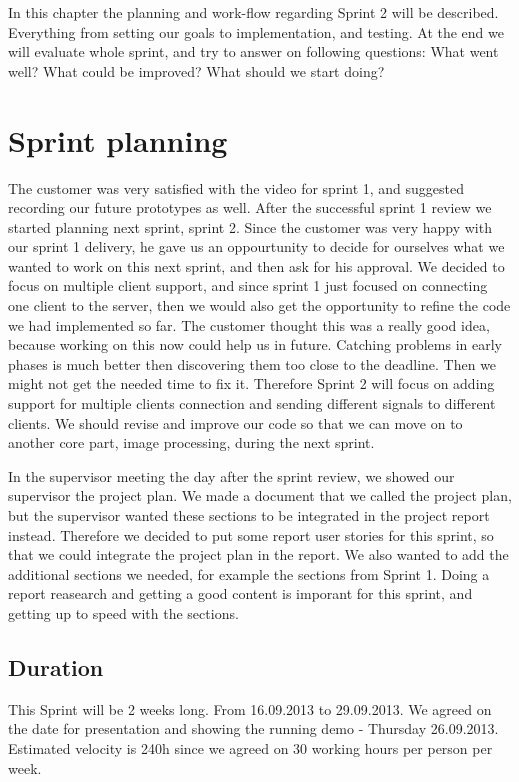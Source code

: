 In this chapter the planning and work-flow regarding Sprint 2 will be described. 
Everything from setting our goals to implementation, and testing. At the end we will evaluate whole sprint, and try to answer on following questions: What went well? What could be improved? What should we start doing? 

\section{Sprint planning}
The customer was very satisfied with the video for sprint 1, and suggested recording our future prototypes as well. 
After the successful sprint 1 review we started planning next sprint, sprint 2. Since the customer was very happy with our sprint 1 delivery, he gave us an oppourtunity to decide for ourselves what we wanted to work on this next sprint, and then ask for his approval. 
We decided to focus on multiple client support, and since sprint 1 just focused on connecting one client to the server, then we would also get the opportunity to refine the code we had implemented so far. The customer thought this was a really good idea, because working on this now could help us in future. Catching problems in early phases is much better then discovering them too close to the deadline. Then we might not get the needed time to fix it. Therefore Sprint 2 will focus on adding support for multiple clients connection and sending different signals to different clients. We should revise and improve our code so that we can move on to another core part, image processing, during the next sprint.


In the supervisor meeting the day after the sprint review, we showed our supervisor the project plan. 
We made a document that we called the project plan, but the supervisor wanted these sections to be integrated in the project report instead. Therefore we decided to put some report user stories for this sprint, so that we could integrate the project plan in the report. We also wanted to add the additional sections we needed, for example the sections from Sprint 1. 
Doing a report reasearch and getting a good content is imporant for this sprint, and getting up to speed with the sections. 

\subsection{Duration}
This Sprint will be 2 weeks long. From 16.09.2013 to 29.09.2013.
We agreed on the date for presentation and showing the running demo - Thursday 26.09.2013.
Estimated velocity is 240h since we agreed on 30 working hours per person per week.

